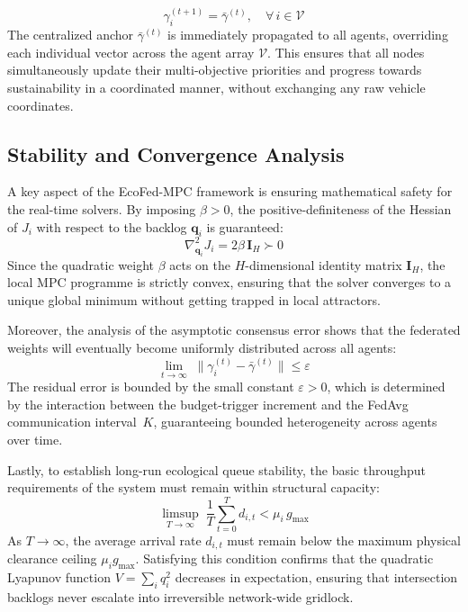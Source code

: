 \documentclass[journal]{IEEEtran}
\begin{document}
\begin{equation}
    \gamma_i^{(t+1)} = \bar{\gamma}^{(t)},\quad \forall\, i \in \mathcal{V}
    \label{eq:fedavg_broadcast}
\end{equation}
The centralized anchor $\bar{\gamma}^{(t)}$ is immediately propagated to all agents, overriding each individual vector across the agent array $\mathcal{V}$. This ensures that all nodes simultaneously update their multi-objective priorities and progress towards sustainability in a coordinated manner, without exchanging any raw vehicle coordinates.

\subsection{Stability and Convergence Analysis}
A key aspect of the EcoFed-MPC framework is ensuring mathematical safety for the real-time solvers. By imposing $\beta > 0$, the positive-definiteness of the Hessian of $J_i$ with respect to the backlog $\mathbf{q}_i$ is guaranteed:
\begin{equation}
    \nabla^{2}_{\mathbf{q}_i} J_i = 2\beta\,\mathbf{I}_{H} \succ 0
    \label{eq:hessian}
\end{equation}
Since the quadratic weight $\beta$ acts on the $H$-dimensional identity matrix $\mathbf{I}_H$, the local MPC programme is strictly convex, ensuring that the solver converges to a unique global minimum without getting trapped in local attractors.

Moreover, the analysis of the asymptotic consensus error shows that the federated weights will eventually become uniformly distributed across all agents:
\begin{equation}
    \lim_{t \to \infty}\;\bigl\|\gamma_i^{(t)} - \bar{\gamma}^{(t)}\bigr\|
    \leq \varepsilon
    \label{eq:consensus_bound}
\end{equation}
The residual error is bounded by the small constant $\varepsilon > 0$, which is determined by the interaction between the budget-trigger increment and the FedAvg communication interval~$K$, guaranteeing bounded heterogeneity across agents over time.

Lastly, to establish long-run ecological queue stability, the basic throughput requirements of the system must remain within structural capacity:
\begin{equation}
    \limsup_{T \to \infty}\;\frac{1}{T}\sum_{t=0}^{T} d_{i,t}
    < \mu_i\, g_{\max}
    \label{eq:stability}
\end{equation}
As $T \to \infty$, the average arrival rate $d_{i,t}$ must remain below the maximum physical clearance ceiling $\mu_i g_{\max}$. Satisfying this condition confirms that the quadratic Lyapunov function $V = \sum_i q_i^2$ decreases in expectation, ensuring that intersection backlogs never escalate into irreversible network-wide gridlock.
\end{document}
